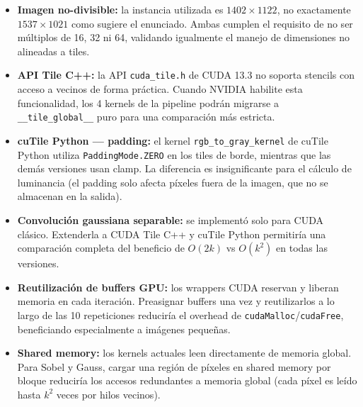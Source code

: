 \documentclass[12pt,a4paper]{article}
\begin{document}
\begin{itemize}
  \item \textbf{Imagen no-divisible:} la instancia utilizada es $1402 \times 1122$, no exactamente $1537 \times 1021$ como sugiere el enunciado. Ambas cumplen el requisito de no ser m\'ultiplos de 16, 32 ni 64, validando igualmente el manejo de dimensiones no alineadas a tiles.
  \item \textbf{API Tile C++:} la API \texttt{cuda\_tile.h} de CUDA 13.3 no soporta stencils con acceso a vecinos de forma pr\'actica. Cuando NVIDIA habilite esta funcionalidad, los 4 kernels de la pipeline podr\'an migrarse a \texttt{\_\_tile\_global\_\_} puro para una comparaci\'on m\'as estricta.
  \item \textbf{cuTile Python --- padding:} el kernel \texttt{rgb\_to\_gray\_kernel} de cuTile Python utiliza \texttt{PaddingMode.ZERO} en los tiles de borde, mientras que las dem\'as versiones usan clamp. La diferencia es insignificante para el c\'alculo de luminancia (el padding solo afecta p\'ixeles fuera de la imagen, que no se almacenan en la salida).
  \item \textbf{Convoluci\'on gaussiana separable:} se implement\'o solo para CUDA cl\'asico. Extenderla a CUDA Tile C++ y cuTile Python permitir\'ia una comparaci\'on completa del beneficio de $O(2k)$ vs $O(k^2)$ en todas las versiones.
  \item \textbf{Reutilizaci\'on de buffers GPU:} los wrappers CUDA reservan y liberan memoria en cada iteraci\'on. Preasignar buffers una vez y reutilizarlos a lo largo de las 10 repeticiones reducir\'ia el overhead de \texttt{cudaMalloc}/\texttt{cudaFree}, beneficiando especialmente a im\'agenes peque\~nas.
  \item \textbf{Shared memory:} los kernels actuales leen directamente de memoria global. Para Sobel y Gauss, cargar una regi\'on de p\'ixeles en shared memory por bloque reducir\'ia los accesos redundantes a memoria global (cada p\'ixel es le\'ido hasta $k^2$ veces por hilos vecinos).
\end{itemize}
\end{document}
